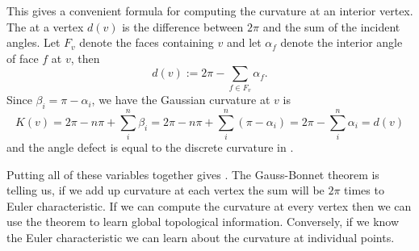 This gives a convenient formula for computing the curvature at an interior vertex.
The  at a vertex $d(v)$ is the difference between $2\pi$ and
the sum of the incident angles.  Let $F_v$ denote the faces containing $v$  
and let $\alpha_f$  denote the interior  angle of face $f$ at $v$, then
\begin{equation} \label{eqn:defect}
d(v):=2\pi -\sum_{f\in F_v}\alpha_f.
\end{equation}
Since $\beta_i=\pi-\alpha_i$, we have the Gaussian curvature at $v$
is 
$$K(v)=2\pi -n\pi+\sum_{i}^n \beta_i=2\pi-n\pi +\sum_{i}^n (\pi-\alpha_i) =2\pi-\sum_i^n\alpha_i=d(v)$$
 and the
 angle defect is equal to the discrete curvature in .







Putting all of these variables together gives .
The  Gauss-Bonnet theorem is  telling us, if we add up curvature
at each vertex the sum will be $2\pi$ times to Euler characteristic.
If we can compute the curvature at every vertex then we can use the theorem
to learn global topological information.
Conversely, if we know the Euler characteristic we can learn about the curvature
at individual points.
